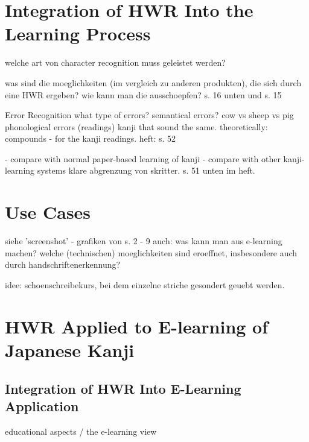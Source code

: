 
\section{Integration of HWR Into the Learning Process}
\label{sec:concept:integrationofhwrintolearning}


welche art von character recognition muss geleistet werden?

was sind die moeglichkeiten (im vergleich zu anderen produkten),
die sich durch eine HWR ergeben?
wie kann man die ausschoepfen? s. 16 unten und s. 15

Error Recognition
what type of errors?
semantical errors? cow vs sheep vs pig
phonological errors (readings) kanji that sound the same.
theoretically: compounds - for the kanji readings.
heft: s. 52

- compare with normal paper-based learning of kanji
- compare with other kanji-learning systems
klare abgrenzung von skritter.
s. 51 unten im heft.



\section{Use Cases}
\label{sec:concept:usecases}

siehe 'screenshot' - grafiken von s. 2 - 9
auch: was kann man aus e-learning machen?
welche (technischen) moeglichkeiten sind eroeffnet,
insbesondere auch durch handschriftenerkennung?

idee: schoenschreibekurs, bei dem einzelne striche
gesondert geuebt werden.


\section{HWR Applied to E-learning of Japanese Kanji}
\subsection{Integration of HWR Into E-Learning Application}
educational aspects / the e-learning view


